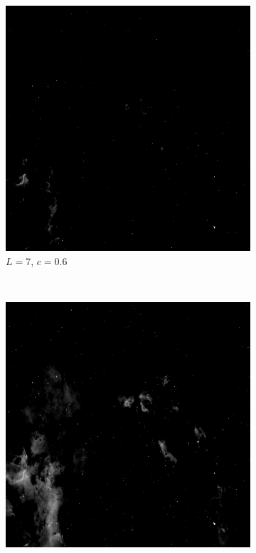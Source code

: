 \documentclass{article}
\begin{document}
\begin{enumerate}[label=(\alph*)]
\begin{figure}[!htb]

        \begin{subfigure}[b]{0.3\textwidth}
            \includegraphics[width=\textwidth]{img/C_7_06.png}
            \caption{$L = 7$, $c = 0.6$}
        \end{subfigure}
        ~
        \begin{subfigure}[b]{0.3\textwidth}
            \includegraphics[width=\textwidth]{img/C_7_07.png}

\end{subfigure}
\end{figure}
\end{enumerate}
\end{document}
